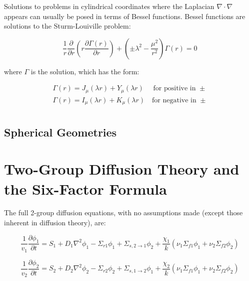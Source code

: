 \documentclass[10pt]{article}
\begin{document}
\begin{flushleft}
Solutions to problems in cylindrical coordinates where the Laplacian \(\nabla\cdot\nabla\) appears can usually be posed in terms of Bessel functions. Bessel functions are solutions to the Sturm-Louiville problem:

\begin{equation}
\label{eq:SturmLouiville}
\frac{1}{r}\frac{\partial}{\partial r}\left(r\frac{\partial\Gamma(r)}{\partial r}\right)+\left(\pm\lambda^2-\frac{\mu^2}{r^2}\right)\Gamma(r)=0
\end{equation}

where \(\Gamma\) is the solution, which has the form:

\begin{equation}
\begin{aligned}
\Gamma(r)=J_{\mu}(\lambda r)+Y_{\mu}(\lambda r)\quad \textrm{ for positive in }\pm\\
\Gamma(r)=I_{\mu}(\lambda r)+K_{\mu}(\lambda r)\quad\textrm{for negative in }\pm\\
\end{aligned}
\end{equation}

\subsection{Spherical Geometries}








\section{Two-Group Diffusion Theory and the Six-Factor Formula}

The full 2-group diffusion equations, with no assumptions made (except those inherent in diffusion theory), are:

\begin{equation}
\label{Group1}
\frac{1}{v_1}\frac{\partial\phi_1}{\partial t}=S_1 + D_1\nabla^2\phi_1-\Sigma_{r1}\phi_1+\Sigma_{s, 2\rightarrow 1}\phi_2+\frac{\chi_1}{k}\left(\nu_1\Sigma_{f1}\phi_1+\nu_2\Sigma_{f2}\phi_2\right)
\end{equation}

\begin{equation}
\label{Group2}
\frac{1}{v_2}\frac{\partial\phi_2}{\partial t}=S_2 + D_2\nabla^2\phi_2-\Sigma_{r2}\phi_2+\Sigma_{s, 1\rightarrow 2}\phi_1+\frac{\chi_2}{k}\left(\nu_1\Sigma_{f1}\phi_1+\nu_2\Sigma_{f2}\phi_2\right)
\end{equation}


\end{flushleft}
\end{document}
